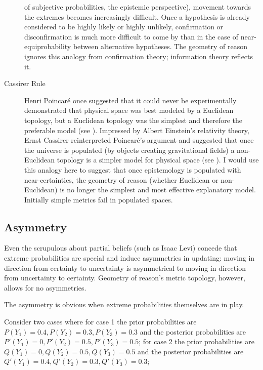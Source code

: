 \documentclass[11pt]{article}
\begin{document}
\begin{description}
  of subjective probabilities, the epistemic perspective), movement
  towards the extremes becomes increasingly difficult. Once a
  hypothesis is already considered to be highly likely or highly
  unlikely, confirmation or disconfirmation is much more difficult to
  come by than in the case of near-equiprobability between alternative
  hypotheses. The geometry of reason ignores this analogy from
  confirmation theory; information theory reflects it.
\item[Cassirer Rule] Henri Poincar{\'e} once suggested that it could
  never be experimentally demonstrated that physical space was best
  modeled by a Euclidean topology, but a Euclidean topology was the
  simplest and therefore the preferable model (see
  ). Impressed by Albert Einstein's
  relativity theory, Ernst Cassirer reinterpreted Poincar{\'e}'s
  argument and suggested that once the universe is populated (by
  objects creating gravitational fields) a non-Euclidean topology is a
  simpler model for physical space (see ). I
  would use this analogy here to suggest that once epistemology is
  populated with near-certainties, the geometry of reason (whether
  Euclidean or non-Euclidean) is no longer the simplest and most
  effective explanatory model. Initially simple metrics fail in
  populated spaces.
\end{description}

\subsection{Asymmetry}
\label{Asymmetry}

Even the scrupulous about partial beliefs (such as Isaac Levi) concede
that extreme probabilities are special and induce asymmetries in
updating: moving in direction from certainty to uncertainty is
asymmetrical to moving in direction from uncertainty to certainty.
Geometry of reason's metric topology, however, allows for no
asymmetries.

The asymmetry is obvious when extreme probabilities themselves are in
play. 

\begin{quotex}
  \label{ex:extreme} Consider two cases
  where for case 1 the prior probabilities are
  $P(Y_{1})=0.4,P(Y_{2})=0.3,P(Y_{3})=0.3$ and the posterior
  probabilities are $P'(Y_{1})=0,P'(Y_{2})=0.5,P'(Y_{3})=0.5$; for
  case 2 the prior probabilities are
  $Q(Y_{1})=0,Q(Y_{2})=0.5,Q(Y_{3})=0.5$ and the posterior
  probabilities are $Q'(Y_{1})=0.4,Q'(Y_{2})=0.3,Q'(Y_{3})=0.3$;
\end{quotex}
\end{document}
